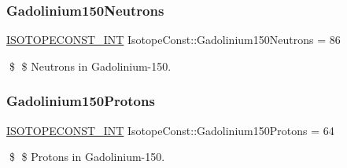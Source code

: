 \subsubsection{\texorpdfstring{Gadolinium150\+Neutrons}{Gadolinium150Neutrons}}
{\footnotesize\ttfamily \mbox{\hyperlink{group___isotope_const-_macros_ga5f18360b3e99483a35c32d789e62621c}{I\+S\+O\+T\+O\+P\+E\+C\+O\+N\+S\+T\+\_\+\+I\+NT}} Isotope\+Const\+::\+Gadolinium150\+Neutrons = 86}

\$ \$ Neutrons in Gadolinium-\/150. \mbox{\label{group___isotope_const-_gadolinium-_gd150_ga640882c685ff120367408436033e5a53}} 
\subsubsection{\texorpdfstring{Gadolinium150\+Protons}{Gadolinium150Protons}}
{\footnotesize\ttfamily \mbox{\hyperlink{group___isotope_const-_macros_ga5f18360b3e99483a35c32d789e62621c}{I\+S\+O\+T\+O\+P\+E\+C\+O\+N\+S\+T\+\_\+\+I\+NT}} Isotope\+Const\+::\+Gadolinium150\+Protons = 64}

\$ \$ Protons in Gadolinium-\/150. 